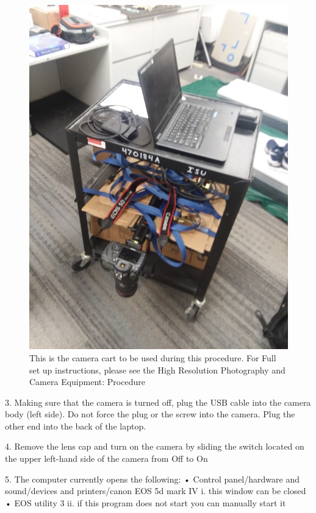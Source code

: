 \begin{figure}[!htp]
\centering
\includegraphics[scale=.2]{Cart2}
\caption{This is the camera cart to be used during this procedure. For Full set up instructions, please see the High Resolution Photography and Camera Equipment: Procedure }
\label{Figure 3}
\end{figure}

3. Making sure that the camera is turned off, plug the USB cable into the camera body (left side). Do not force the plug or the screw into the camera. Plug the other end into the back of the laptop.

4. Remove the lens cap and turn on the camera by sliding the switch located on the upper left-hand side of the camera from Off to On

5. The computer currently opens the following:
•	Control panel/hardware and sound/devices and printers/canon EOS 5d mark IV
i.	this window can be closed
•	EOS utility 3
ii.	if this program does not start you can manually start it

